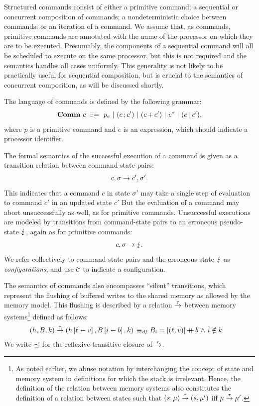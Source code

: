 \documentclass[11pt]{report}
\begin{document}
Structured commands consist of either a primitive command; a sequential or concurrent composition of commands; a nondeterministic choice between commands; or an iteration of a command. We assume that, as commands, primitive commands are annotated with the name of the processor on which they are to be executed. Presumably, the components of a sequential command will all be scheduled to execute on the same processor, but this is not required and the semantics handles all cases uniformly. This generality is not likely to be practically useful for sequential composition, but is crucial to the semantics of concurrent composition, as will be discussed shortly. 

The language of commands is defined by the following grammar: \[ \mathbf{Comm}~c ~::=~ p_e ~|~ (c \operatorname{;} c') ~|~ (c \operatorname{+} c') ~|~ c^{\operatorname{\ast}} ~|~ (c \operatorname{|\!|} c'),\] where $p$ is a primitive command and $e$ is an expression, which should indicate a processor identifier.  

The formal semantics of the successful execution of a command is given as a  transition relation between command-state pairs: \[ c,\sigma \rightarrow c',\sigma'.\] This indicates that a command $c$ in state $\sigma'$ may take a single step of evaluation to command $c'$ in an updated state $c'$ But the evaluation of a command may abort unsuccessfully as well, as for primitive commands. Unsuccessful executions are modeled by transitions from command-state pairs to an erroneous pseudo-state $\lightning$, again as for primitive commands: \[ c,\sigma \rightarrow \lightning. \] We refer collectively to command-state pairs and the erroneous state $\lightning$ as \emph{configurations}, and use $\mathcal{C}$ to indicate a configuration. 

The semantics of commands also encompasses ``silent'' transitions, which represent the flushing of buffered writes to the shared memory as allowed by the memory model. This flushing is described by a relation $\stackrel{\tau}{\rightarrow}$ between memory systems\footnote{As noted earlier, we abuse notation by interchanging the concept of state and memory system in definitions for which the stack is irrelevant. Hence, the definition of the relation between memory systems  also constitutes the definition of a relation between states such that $(s,\mu) \stackrel{\tau}{\rightarrow} (s,\mu')$ iff $\mu \stackrel{\tau}{\rightarrow} \mu'$.} defined as follows: \begin{align*} (h,B,k) \stackrel{\tau}{\rightarrow} (h \left[ \ell \shortleftarrow v \right],B \left[ i \shortleftarrow b \right],k) \operatorname{\;\equiv_{\mathit{df}}\;} & B_i = \left[(\ell,v)\right] \operatorname{+\!\!\!+} b \operatorname{\,\wedge\,} i \notin k 
\end{align*} We write $\preceq$ for the reflexive-transitive closure of $\stackrel{\tau}{\rightarrow}$. 
\end{document}
